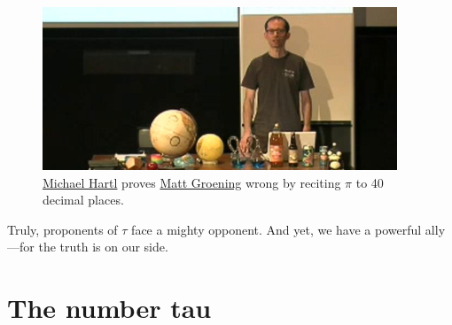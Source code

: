 \begin{figure}
\begin{center}
\includegraphics{images/figures/futurama_math_lecture.png} %
\end{center}
\caption{\href{https://tauday.com/tau-manifesto/\#sec-about_the_author}{Michael Hartl} proves \href{https://en.wikipedia.org/wiki/Matt_Groening}{Matt Groening} wrong by reciting $\pi$ to 40 decimal places.\label{fig:futurama_video}}
\end{figure}

Truly, proponents of $\tau$ face a mighty opponent. And yet, we have a powerful ally---for the truth is on our side.


\section{The number tau} %
\label{sec:the_number_tau}

